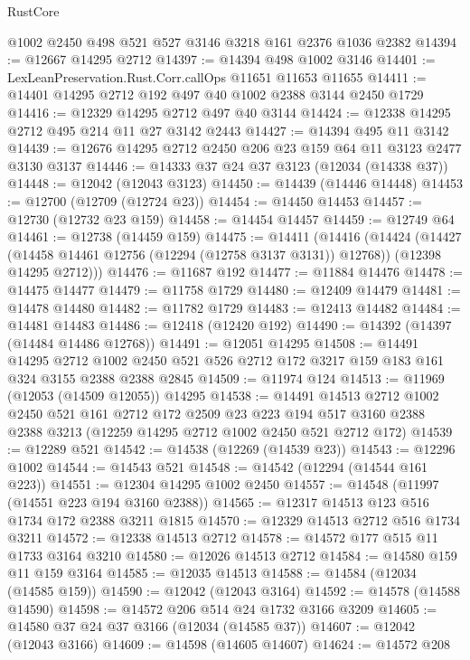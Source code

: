 \begin{lexlean}{RustCore}
\begin{coremodule}
    @1002
    @2450
    @498
    @521
    @527
    @3146
    @3218
    @161
    @2376
    @1036
    @2382
@14394 := @12667 @14295 @2712
@14397 := @14394 @498 @1002 @3146
@14401 := LexLeanPreservation.Rust.Corr.callOps @11651 @11653 @11655
@14411 := @14401 @14295 @2712 @192 @497 @40 @1002 @2388 @3144 @2450 @1729
@14416 := @12329 @14295 @2712 @497 @40 @3144
@14424 := @12338 @14295 @2712 @495 @214 @11 @27 @3142 @2443
@14427 := @14394 @495 @11 @3142
@14439 := @12676 @14295 @2712 @2450 @206 @23 @159 @64 @11 @3123 @2477 @3130 @3137
@14446 := @14333 @37 @24 @37 @3123 (@12034 (@14338 @37))
@14448 := @12042 (@12043 @3123)
@14450 := @14439 (@14446 @14448)
@14453 := @12700 (@12709 (@12724 @23))
@14454 := @14450 @14453
@14457 := @12730 (@12732 @23 @159)
@14458 := @14454 @14457
@14459 := @12749 @64
@14461 := @12738 (@14459 @159)
@14475 := @14411
    (@14416
      (@14424
        (@14427 (@14458 @14461 @12756 (@12294 (@12758 @3137 @3131)) @12768))
        (@12398 @14295 @2712)))
@14476 := @11687 @192
@14477 := @11884 @14476
@14478 := @14475 @14477
@14479 := @11758 @1729
@14480 := @12409 @14479
@14481 := @14478 @14480
@14482 := @11782 @1729
@14483 := @12413 @14482
@14484 := @14481 @14483
@14486 := @12418 (@12420 @192)
@14490 := @14392 (@14397 (@14484 @14486 @12768))
@14491 := @12051 @14295
@14508 := @14491
    @14295
    @2712
    @1002
    @2450
    @521
    @526
    @2712
    @172
    @3217
    @159
    @183
    @161
    @324
    @3155
    @2388
    @2388
    @2845
@14509 := @11974 @124
@14513 := @11969 (@12053 (@14509 @12055)) @14295
@14538 := @14491
    @14513
    @2712
    @1002
    @2450
    @521
    @161
    @2712
    @172
    @2509
    @23
    @223
    @194
    @517
    @3160
    @2388
    @2388
    @3213
    (@12259 @14295 @2712 @1002 @2450 @521 @2712 @172)
@14539 := @12289 @521
@14542 := @14538 (@12269 (@14539 @23))
@14543 := @12296 @1002
@14544 := @14543 @521
@14548 := @14542 (@12294 (@14544 @161 @223))
@14551 := @12304 @14295 @1002 @2450
@14557 := @14548 (@11997 (@14551 @223 @194 @3160 @2388))
@14565 := @12317 @14513 @123 @516 @1734 @172 @2388 @3211 @1815
@14570 := @12329 @14513 @2712 @516 @1734 @3211
@14572 := @12338 @14513 @2712
@14578 := @14572 @177 @515 @11 @1733 @3164 @3210
@14580 := @12026 @14513 @2712
@14584 := @14580 @159 @11 @159 @3164
@14585 := @12035 @14513
@14588 := @14584 (@12034 (@14585 @159))
@14590 := @12042 (@12043 @3164)
@14592 := @14578 (@14588 @14590)
@14598 := @14572 @206 @514 @24 @1732 @3166 @3209
@14605 := @14580 @37 @24 @37 @3166 (@12034 (@14585 @37))
@14607 := @12042 (@12043 @3166)
@14609 := @14598 (@14605 @14607)
@14624 := @14572
    @208

\end{coremodule}
\end{lexlean}
